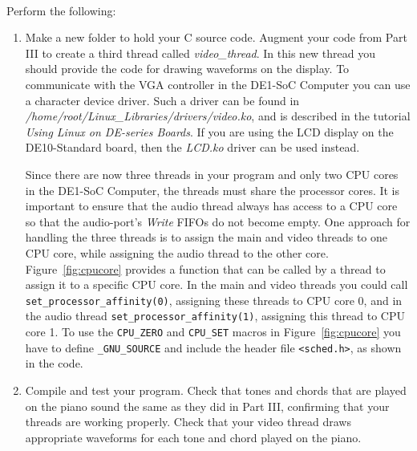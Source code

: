 \documentclass[epsfig,10pt,fullpage]{article}
\begin{document}
~\\
\noindent
Perform the following:

\begin{enumerate}
\item Make a new folder to hold your C source code. Augment your code from Part III to
create a third thread called {\it video\_thread}. In this new thread you should provide
the code for drawing waveforms on the display. To communicate with the VGA controller
in the DE1-SoC Computer you can use a character device driver. Such a driver can be found
in {\it /home/root/Linux\_Libraries/drivers/video.ko}, and is described in the tutorial 
{\it Using Linux on DE-series Boards}. If you are using the LCD display on the
DE10-Standard board, then the {\it LCD.ko} driver can be used instead. 

Since there are now three threads in your program and only two CPU cores in the DE1-SoC
Computer, the threads must share the processor cores. It is important to ensure that
the audio thread always has access to a CPU core so that the audio-port's {\it Write} FIFOs
do not become empty. One approach for handling the three threads is to assign
the main and video threads to one CPU core, while assigning the audio thread to the other
core. Figure~\ref{fig:cpucore} provides a function that can be called by a thread to
assign it to a specific CPU core. In the main and video threads you could call 
\texttt{set\_processor\_affinity(0)}, assigning these threads to CPU core 0, 
and in the audio thread \texttt{set\_processor\_affinity(1)}, assigning 
this thread to CPU core 1. To use the \texttt{CPU\_ZERO} and \texttt{CPU\_SET} macros in 
Figure~\ref{fig:cpucore} you have to define \texttt{\_GNU\_SOURCE} and include the header
file \texttt{<sched.h>}, as shown in the code.
\item Compile and test your program. Check that tones and chords that are played on the
piano sound the same as they did in Part III, confirming that your threads are working
properly. Check that your video thread draws appropriate waveforms for each tone and chord
played on the piano.
\end{enumerate}
\end{document}
